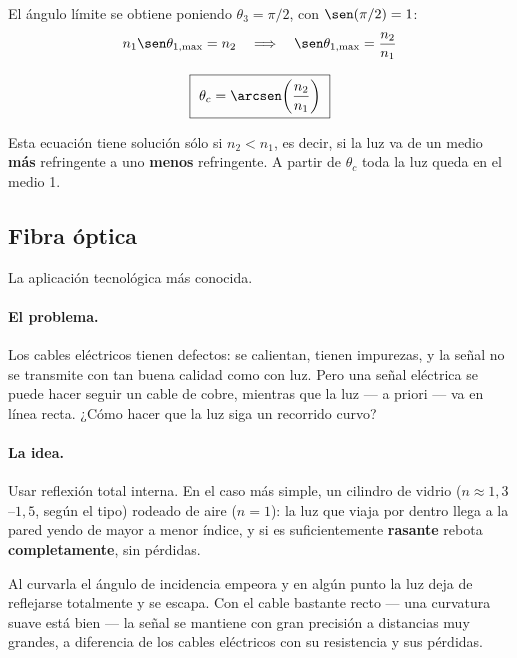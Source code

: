\documentclass[12pt,a4paper]{article}
\begin{document}
El ángulo límite se obtiene poniendo $\theta_3 = \pi/2$, con $\sen(\pi/2) = 1$:
\[
n_1 \sen\theta_{1,\max} = n_2
\quad\Longrightarrow\quad
\sen\theta_{1,\max} = \frac{n_2}{n_1}
\]

\begin{keybox}
\[
\boxed{\ \theta_c = \arcsen\!\left(\frac{n_2}{n_1}\right)\ }
\]
\end{keybox}

\begin{warnbox}
Esta ecuación tiene solución sólo si $n_2 < n_1$, es decir, si la luz va de un
medio \textbf{más} refringente a uno \textbf{menos} refringente. A partir de
$\theta_c$ toda la luz queda en el medio 1.
\end{warnbox}

\subsection{Fibra óptica}

La aplicación tecnológica más conocida.

\paragraph{El problema.}
Los cables eléctricos tienen defectos: se calientan, tienen impurezas, y la señal
no se transmite con tan buena calidad como con luz. Pero una señal eléctrica se
puede hacer seguir un cable de cobre, mientras que la luz --- a priori --- va en
línea recta. ¿Cómo hacer que la luz siga un recorrido curvo?

\paragraph{La idea.}
Usar reflexión total interna. En el caso más simple, un cilindro de vidrio
($n \approx 1{,}3$--$1{,}5$, según el tipo) rodeado de aire ($n = 1$): la luz que
viaja por dentro llega a la pared yendo de mayor a menor índice, y si es
suficientemente \textbf{rasante} rebota \textbf{completamente}, sin pérdidas.

\begin{warnbox}
Al curvarla el ángulo de incidencia empeora y en algún punto la luz deja de
reflejarse totalmente y se escapa. Con el cable bastante recto --- una curvatura
suave está bien --- la señal se mantiene con gran precisión a distancias muy
grandes, a diferencia de los cables eléctricos con su resistencia y sus pérdidas.
\end{warnbox}
\end{document}
